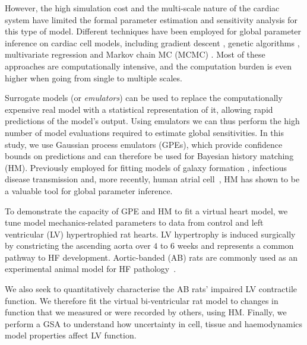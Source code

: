 However, the high simulation cost and the multi-scale nature of the cardiac system have limited the formal parameter estimation and sensitivity analysis for this type of model. Different techniques have been employed for global parameter inference on cardiac cell models, including gradient descent \cite{Dokos:2004}, genetic algorithms \cite{Groenendaal:2015}, multivariate regression \cite{Sarkar:2010} and Markov chain MC (\acs{MCMC}) \cite{Johnstone:2016}. Most of these approaches are computationally intensive, and the computation burden is even higher when going from single to multiple scales.

Surrogate models (or \textit{emulators}) can be used to replace the computationally expensive real model with a statistical representation of it, allowing rapid predictions of the model's output. Using emulators we can thus perform the high number of model evaluations required to estimate global sensitivities. In this study, we use Gaussian process emulators (GPEs), which provide confidence bounds on predictions and can therefore be used for Bayesian history matching (HM). Previously employed for fitting models of galaxy formation \cite{Vernon:2010}, infectious disease transmission \cite{Andrianakis:2015} and, more recently, human atrial cell~\cite{Coveney:2018}, HM has shown to be a valuable tool for global parameter inference.

To demonstrate the capacity of GPE and HM to fit a virtual heart model, we tune model mechanics-related parameters to data from control and left ventricular (LV) hypertrophied rat hearts. LV hypertrophy is induced surgically by constricting the ascending aorta over $4$ to $6$ weeks and represents a common pathway to HF development. Aortic-banded (AB) rats are commonly used as an experimental animal model for HF pathology~\cite{Camacho:2016}.

We also seek to quantitatively characterise the AB rats' impaired LV contractile function. We therefore fit the virtual bi-ventricular rat model to changes in function that we measured or were recorded by others, using HM. Finally, we perform a GSA to understand how uncertainty in cell, tissue and haemodynamics model properties affect LV function.



%
%
%
